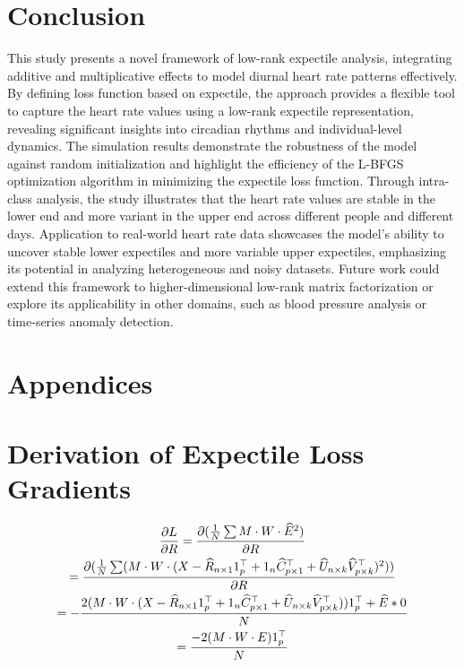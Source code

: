 \documentclass{article}
\begin{document}
\section{Conclusion}
This study presents a novel framework of low-rank expectile analysis, integrating additive and multiplicative effects to model diurnal heart rate patterns effectively. By defining loss function based on expectile, the approach provides a flexible tool to capture the heart rate values using a low-rank expectile representation, revealing significant insights into circadian rhythms and individual-level dynamics. The simulation results demonstrate the robustness of the model against random initialization and highlight the efficiency of the L-BFGS optimization algorithm in minimizing the expectile loss function. Through intra-class analysis, the study illustrates that the heart rate values are stable in the lower end and more variant in the upper end across different people and different days. Application to real-world heart rate data showcases the model's ability to uncover stable lower expectiles and more variable upper expectiles, emphasizing its potential in analyzing heterogeneous and noisy datasets. Future work could extend this framework to higher-dimensional low-rank matrix factorization or explore its applicability in other domains, such as blood pressure analysis or time-series anomaly detection. 

\clearpage




\newpage
\section*{Appendices}
\appendix
\section{Derivation of Expectile Loss Gradients} \label{appendix.a}
\begin{gather*}
    \pdv{L}{R} = \pdv{(\frac{1}{N}\sum M \cdot W \cdot \widehat{E}^2)}{R} \\
    = \pdv{(\frac{1}{N}\sum(M \cdot W \cdot (X - \widehat{R}_{n \times 1}1^{\top}_{p} + 1_{n}\widehat{C}_{p \times 1}^{\top} + \widehat{U}_{n \times k}\widehat{V}^{\top}_{p \times k})^2))}{R}\\
    = -\frac{2(M \cdot W \cdot (X - \widehat{R}_{n \times 1}1^{\top}_{p} + 1_{n}\widehat{C}_{p \times 1}^{\top} + \widehat{U}_{n \times k}\widehat{V}^{\top}_{p \times k}))1^{\top}_{p} + \widehat{E} * 0} {N}\\
    = \frac{-2(M \cdot W \cdot E)1_{p}^\top}{N}
\end{gather*}
\end{document}

